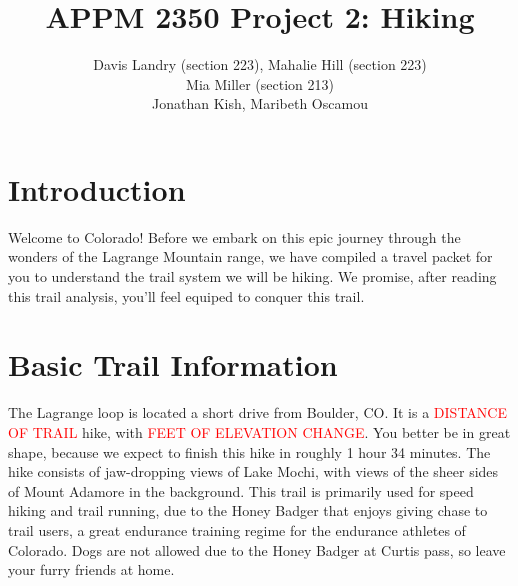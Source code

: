 \documentclass[12pt]{article}   %
\theoremstyle{definition}
\numberwithin{equation}{section}
\begin{document}
\parskip10pt
\parindent0pt
\baselineskip15pt
\doublespacing

\title{APPM 2350 Project 2: Hiking}
\author{Davis Landry (section 223), Mahalie Hill (section 223)\\Mia Miller (section 213) \\ Jonathan Kish, Maribeth Oscamou}

\pagestyle{fancy}
\renewcommand{\sectionmark}[1]{\markright{#1}{}}

\fancyhf{}

\rhead{\fancyplain{}{\thepage}} %
\lhead{\fancyplain{}{\rightmark }} %

\maketitle
\newpage
\tableofcontents
\newpage
\newpage
\lhead{]Landry, Hill, Miller Project 1}

\section{Introduction} \label{APPM2350proj01sec01}

\quad Welcome to Colorado! Before we embark on this epic journey through the wonders of the Lagrange Mountain range, we have compiled a travel packet for you to understand the trail system we will be hiking. We promise, after reading this trail analysis, you'll feel equiped to conquer this trail.

\section{Basic Trail Information} \label{APPM2350proj01sec02}

\quad The Lagrange loop is located a short drive from Boulder, CO. It is a \textcolor{red}{DISTANCE OF TRAIL} hike, with \textcolor{red}{FEET OF ELEVATION CHANGE}. You better be in great shape, because we expect to finish this hike in roughly 1 hour 34 minutes. The hike consists of jaw-dropping views of Lake Mochi, with views of the sheer sides of Mount Adamore in the background. This trail is primarily used for speed hiking and trail running, due to the Honey Badger that enjoys giving chase to trail users, a great endurance training regime for the endurance athletes of Colorado. Dogs are not allowed due to the Honey Badger at Curtis pass, so leave your furry friends at home.
\end{document}
